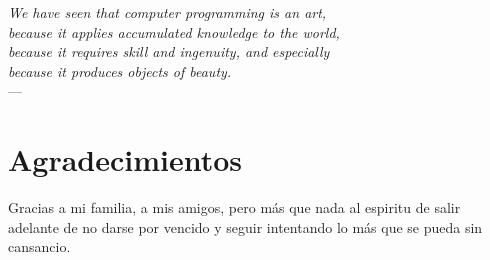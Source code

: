 
\begin{flushright}{\slshape    
    We have seen that computer programming is an art, \\ 
    because it applies accumulated knowledge to the world, \\ 
    because it requires skill and ingenuity, and especially \\
    because it produces objects of beauty.} \\ \medskip
    ---  \citep{knuth:1974}
\end{flushright}



\bigskip

\begingroup
\let\clearpage\relax
\let\cleardoublepage\relax
\let\cleardoublepage\relax
\chapter*{Agradecimientos}
Gracias a mi familia, a mis amigos, pero más que nada al espiritu de salir adelante
de no darse por vencido y seguir intentando lo más que se pueda sin cansancio.

\bigskip


\endgroup




